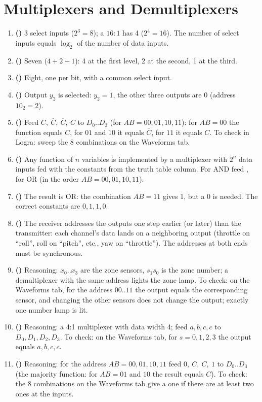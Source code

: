 \section*{Multiplexers and Demultiplexers}
\begin{enumerate}
  \item \textbf{()} 3 select inputs ($2^3=8$); a $16:1$ has 4 ($2^4=16$). The number of select inputs equals $\log_2$ of the number of data inputs.
  \item \textbf{()} Seven ($4+2+1$): 4 at the first level, 2 at the second, 1 at the third.
  \item \textbf{()} Eight, one per bit, with a common select input.
  \item \textbf{()} Output $y_2$ is selected: $y_2=1$, the other three outputs are 0 (address $10_2=2$).
  \item \textbf{()} Feed $C,\ \overline{C},\ \overline{C},\ C$ to $D_0..D_3$ (for $AB=00,01,10,11$): for $AB=00$ the function equals $C$, for $01$ and $10$ it equals $\overline{C}$, for $11$ it equals $C$. To check in Logra: sweep the 8 combinations on the Waveforms tab.
  \item \textbf{()} Any function of $n$ variables is implemented by a multiplexer with $2^n$ data inputs fed with the constants from the truth table column. For AND feed , for OR  (in the order $AB=00,01,10,11$). 
  \item \textbf{()} The result is OR: the combination $AB=11$ gives 1, but a 0 is needed. The correct constants are $0,1,1,0$.
  \item \textbf{()} The receiver addresses the outputs one step earlier (or later) than the transmitter: each channel's data lands on a neighboring output (throttle on ``roll'', roll on ``pitch'', etc., yaw on ``throttle''). The addresses at both ends must be synchronous.
  \item \textbf{()} Reasoning: $x_0..x_3$ are the zone sensors, $s_1s_0$ is the zone number; a demultiplexer with the same address lights the zone lamp. To check: on the Waveforms tab, for the address $00..11$ the output equals the corresponding sensor, and changing the other sensors does not change the output; exactly one number lamp is lit.
  \item \textbf{()} Reasoning: a 4:1 multiplexer with data width 4; feed $a,b,c,c$ to $D_0,D_1,D_2,D_3$. To check: on the Waveforms tab, for $s=0,1,2,3$ the output equals $a,b,c,c$.
  \item \textbf{()} Reasoning: for the address $AB=00,01,10,11$ feed $0,\ C,\ C,\ 1$ to $D_0..D_3$ (the majority function: for $AB=01$ and $10$ the result equals $C$). To check: the 8 combinations on the Waveforms tab give a one if there are at least two ones at the inputs.
\end{enumerate}

